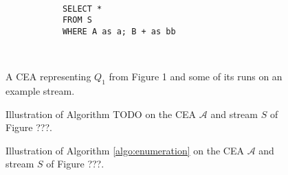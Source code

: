 
\newpage

\begin{figure}[H]
  \centering
  \begin{subfigure}[t]{\textwidth}
    \centering
  \end{subfigure}
  \\
  \begin{subfigure}[b]{\textwidth}
    \begin{verbatim}
      SELECT *
      FROM S
      WHERE A as a; B + as bb
    \end{verbatim}
  \end{subfigure}
  \\
  \begin{subfigure}[b]{\textwidth}
    \centering
  \end{subfigure}
  \caption{A CEA representing $Q_{1}$ from Figure 1 and some of its runs on an example stream.}
  \label{fig:label}
\end{figure}

\begin{figure}[H]
  \centering
  \begin{subfigure}[t]{0.1\linewidth}
  \end{subfigure}
  \begin{subfigure}[t]{0.1\linewidth}
  \end{subfigure}
  \begin{subfigure}[t]{0.24\linewidth}
  \end{subfigure}
  \begin{subfigure}[t]{0.24\linewidth}
  \end{subfigure}
  \begin{subfigure}[t]{0.28\linewidth}
  \end{subfigure}
  \caption{Illustration of Algorithm TODO on the CEA $\mathcal{A}$ and stream $S$ of Figure ???.}
  \label{fig:label}
\end{figure}

\begin{figure}[H]
  \centering
  \begin{subfigure}[t]{0.24\linewidth}
  \end{subfigure}
  \begin{subfigure}[t]{0.24\linewidth}
  \end{subfigure}
  \begin{subfigure}[t]{0.24\linewidth}
  \end{subfigure}
  \begin{subfigure}[t]{0.24\linewidth}
  \end{subfigure}
  \caption{Illustration of Algorithm \ref{algo:enumeration} on the CEA $\mathcal{A}$ and stream $S$ of Figure ???.}
  \label{fig:label}
\end{figure}

